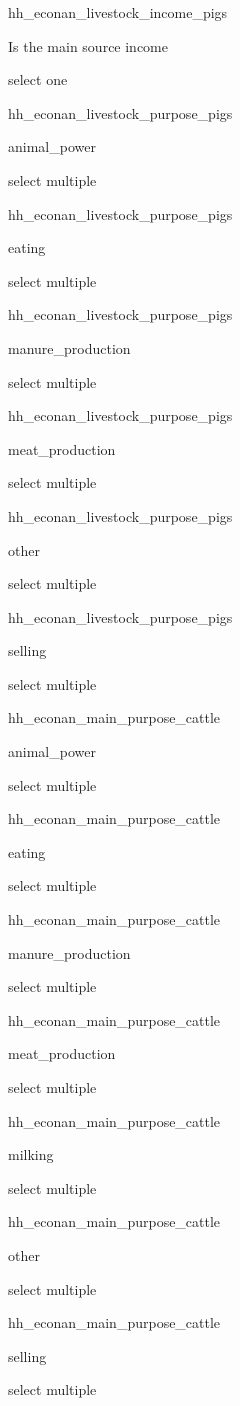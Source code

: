 \documentclass[]{article}
\begin{document}
hh\_econan\_livestock\_income\_pigs

Is the main source income

select one

hh\_econan\_livestock\_purpose\_pigs

animal\_power

select multiple

hh\_econan\_livestock\_purpose\_pigs

eating

select multiple

hh\_econan\_livestock\_purpose\_pigs

manure\_production

select multiple

hh\_econan\_livestock\_purpose\_pigs

meat\_production

select multiple

hh\_econan\_livestock\_purpose\_pigs

other

select multiple

hh\_econan\_livestock\_purpose\_pigs

selling

select multiple

hh\_econan\_main\_purpose\_cattle

animal\_power

select multiple

hh\_econan\_main\_purpose\_cattle

eating

select multiple

hh\_econan\_main\_purpose\_cattle

manure\_production

select multiple

hh\_econan\_main\_purpose\_cattle

meat\_production

select multiple

hh\_econan\_main\_purpose\_cattle

milking

select multiple

hh\_econan\_main\_purpose\_cattle

other

select multiple

hh\_econan\_main\_purpose\_cattle

selling

select multiple
\end{document}
